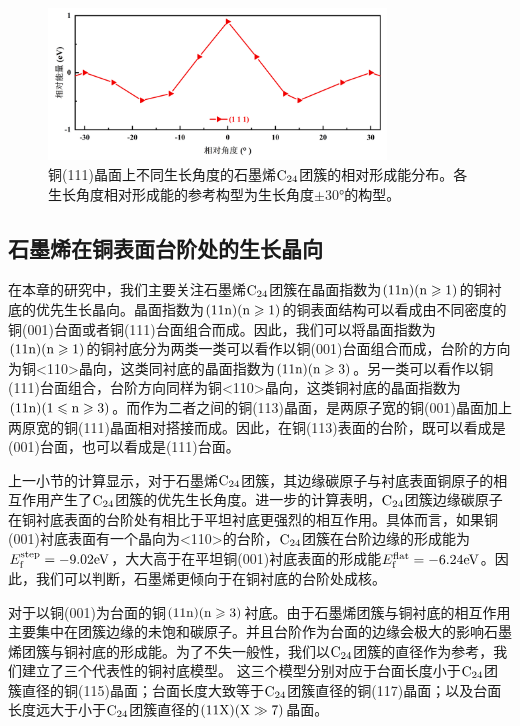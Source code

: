         \begin{figure}[htb]
            \includegraphics[width=0.8\textwidth]{pic/GO_C24_flat_111_energy.png}
            \caption{铜(111)晶面上不同生长角度的石墨烯$\rm{C_{24}}$团簇的相对形成能分布。各生长角度相对形成能的参考构型为生长角度$\pm 30$\si{\degree}的构型。
            }
            \label{fig:GO_111_energy}
        \end{figure}


    \subsection{石墨烯在铜表面台阶处的生长晶向}
        在本章的研究中，我们主要关注石墨烯$\rm{C_{24}}$团簇在晶面指数为$\rm{(11n)(n \geqslant 1)}$的铜衬底的优先生长晶向。晶面指数为$\rm{(11n)(n \geqslant 1)}$的铜表面结构可以看成由不同密度的铜(001)台面或者铜(111)台面组合而成。因此，我们可以将晶面指数为$\rm{(11n)(n \geqslant 1)}$的铜衬底分为两类\chinesecolon 一类可以看作以铜(001)台面组合而成，台阶的方向为铜<110>晶向，这类同衬底的晶面指数为$\rm{(11n)(n \geqslant 3)}$。另一类可以看作以铜(111)台面组合，台阶方向同样为铜<110>晶向，这类铜衬底的晶面指数为$\rm{(11n)(1 \leqslant n \geqslant 3)}$。而作为二者之间的铜(113)晶面，是两原子宽的铜(001)晶面加上两原宽的铜(111)晶面相对搭接而成。因此，在铜(113)表面的台阶，既可以看成是(001)台面，也可以看成是(111)台面。

        上一小节的计算显示，对于石墨烯$\rm{C_{24}}$团簇，其边缘碳原子与衬底表面铜原子的相互作用产生了$\rm{C_{24}}$团簇的优先生长角度。进一步的计算表明，$\rm{C_{24}}$团簇边缘碳原子在铜衬底表面的台阶处有相比于平坦衬底更强烈的相互作用。具体而言，如果铜(001)衬底表面有一个晶向为<110>的台阶，$\rm{C_{24}}$团簇在台阶边缘的形成能为$E_{\rm f}^{\rm step}=-9.02 \si{\electronvolt}$，大大高于在平坦铜(001)衬底表面的形成能$E_{\rm f}^{\rm flat}=-6.24 \si{\electronvolt}$。因此，我们可以判断，石墨烯更倾向于在铜衬底的台阶处成核。

        对于以铜(001)为台面的铜$\rm{(11n)(n \geqslant 3)}$衬底。由于石墨烯团簇与铜衬底的相互作用主要集中在团簇边缘的未饱和碳原子。并且台阶作为台面的边缘会极大的影响石墨烯团簇与铜衬底的形成能。为了不失一般性，我们以$\rm{C_{24}}$团簇的直径作为参考，我们建立了三个代表性的铜衬底模型。
        这三个模型分别对应于台面长度小于$\rm{C_{24}}$团簇直径的铜(115)晶面；台面长度大致等于$\rm{C_{24}}$团簇直径的铜(117)晶面；以及台面长度远大于小于$\rm{C_{24}}$团簇直径的$\rm (11X)(X \gg 7 )$晶面。

